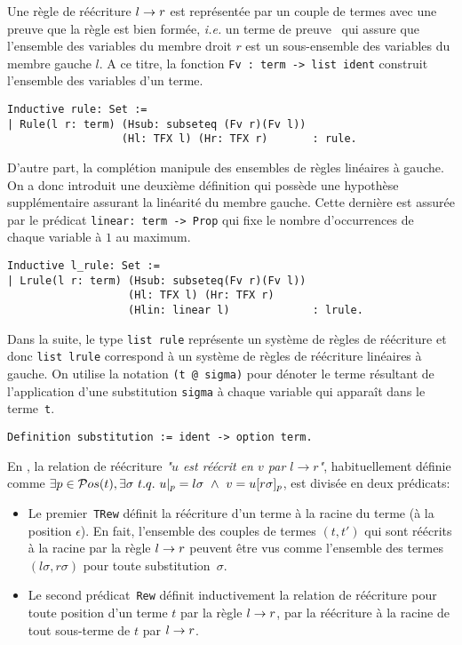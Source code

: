 Une règle de réécriture $l \rightarrow r$ est représentée par un couple de termes avec une preuve
que la règle est bien formée, \textit{i.e.} un terme de preuve \coq\ qui assure que l'ensemble des variables du membre droit $r$
est un sous-ensemble des variables du membre gauche $l$.
A ce titre, la fonction \lstinline!Fv : term -> list ident! construit l'ensemble des variables d'un terme. 
\begin{lstlisting}
Inductive rule: Set :=
| Rule(l r: term) (Hsub: subseteq (Fv r)(Fv l))
                  (Hl: TFX l) (Hr: TFX r)       : rule.
\end{lstlisting}
D'autre part, la complétion manipule des ensembles de règles linéaires à gauche. On a donc introduit une deuxième définition
qui possède une hypothèse supplémentaire assurant la linéarité du membre gauche. Cette dernière  est assurée par le prédicat
\lstinline!linear: term -> Prop! qui fixe le nombre d'occurrences de chaque variable à $1$ au maximum.
\begin{lstlisting}
Inductive l_rule: Set :=
| Lrule(l r: term) (Hsub: subseteq(Fv r)(Fv l))
                   (Hl: TFX l) (Hr: TFX r)
                   (Hlin: linear l)             : lrule.
\end{lstlisting}

Dans la suite, le type \lstinline!list rule! représente un système de règles de réécriture et donc
\lstinline!list lrule! correspond à un système de règles de réécriture linéaires à gauche.
On utilise la notation \lstinline!(t @ sigma)! pour dénoter le terme résultant de 
l'application d'une substitution \lstinline!sigma! à chaque variable qui apparaît dans le terme~\lstinline!t!. 

\begin{lstlisting}
Definition substitution := ident -> option term.
\end{lstlisting}

\noindent
En \coq, la relation de réécriture \emph{"$u$ est réécrit en $v$ par $l
  \rightarrow r$"}, habituellement définie comme $\exists p \in \mathcal{ P}os(t),\exists \sigma \
t.q.\ u|_p = l\sigma \ \land \ v = u [ r\sigma ]_p$, est divisée en deux prédicats:

\begin{itemize}
\item Le premier~\lstinline!TRew! définit la réécriture d'un terme à la racine du terme (à la position $\epsilon$). En
  fait, l'ensemble des couples de termes $(t, t')$ qui sont réécrits à la racine par la règle $l \rightarrow r$
  peuvent être vus comme l'ensemble des termes $(l\sigma, r\sigma)$ pour toute substitution~$\sigma$.

\item 
  Le second prédicat~\lstinline!Rew! définit inductivement la relation de réécriture pour toute position d'un terme $t$
  par la règle $l \rightarrow r$, par la réécriture à la racine de tout sous-terme de $t$ par $l \rightarrow r$.
\end{itemize}


